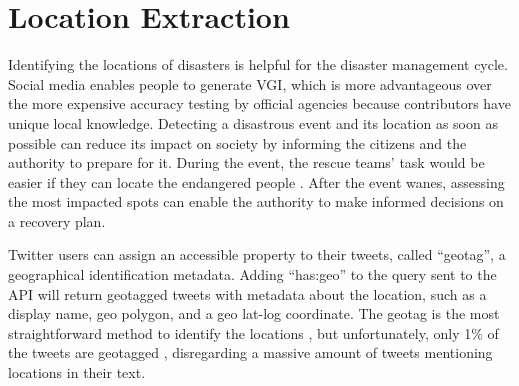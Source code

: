 \section{Location Extraction}
Identifying the locations of disasters is helpful for the disaster management cycle. Social media
enables people to generate \ac{VGI}, which is more advantageous over the more expensive accuracy
testing by official agencies because contributors have unique local knowledge.  Detecting a
disastrous event and its location as soon as possible can reduce its impact on society
\cite{debruijnGlobalDatabaseHistoric2019b} by informing the citizens and the authority to prepare
for it. During the event, the rescue teams' task would be easier if they can locate the endangered
people \cite{singhEventClassificationLocation2019}. After the event wanes, assessing the most
impacted spots can enable the authority to make informed decisions on a recovery plan.

Twitter users can assign an accessible property to their tweets, called ``geotag'', a geographical
identification metadata. Adding ``has:geo'' to the query sent to the API will return geotagged
tweets with metadata about the location, such as a display name, geo polygon, and a geo lat-log
coordinate. The geotag is the most straightforward method to identify the locations 
\cite{fengExtractionPluvialFlood2018}, but unfortunately, only 1\% of the tweets are geotagged
\cite{middletonLocationExtractionSocial2018}, disregarding a massive amount of tweets
mentioning locations in their text.

